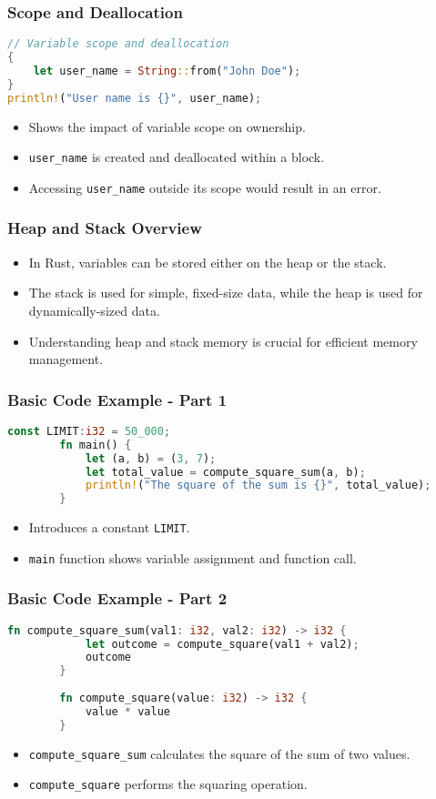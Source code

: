 \documentclass[aspectratio=169, table]{beamer}
\begin{document}
\begin{frame}[fragile]
\frametitle{Scope and Deallocation}
\begin{lstlisting}[language=Rust]
// Variable scope and deallocation
{
	let user_name = String::from("John Doe"); 
} 
println!("User name is {}", user_name); 
\end{lstlisting}
\begin{itemize}
\item Shows the impact of variable scope on ownership.
\item \texttt{user\_name} is created and deallocated within a block.
\item Accessing \texttt{user\_name} outside its scope would result in an error.
\end{itemize}
\end{frame}

\begin{frame}[fragile]
\frametitle{Heap and Stack Overview}
\begin{itemize}
\item In Rust, variables can be stored either on the heap or the stack.
\item The stack is used for simple, fixed-size data, while the heap is used for dynamically-sized data.
\item Understanding heap and stack memory is crucial for efficient memory management.
\end{itemize}
\end{frame}

\begin{frame}[fragile]
	\frametitle{Basic Code Example - Part 1}
	\begin{lstlisting}[language=Rust]
		const LIMIT:i32 = 50_000; 
		fn main() {
			let (a, b) = (3, 7); 
			let total_value = compute_square_sum(a, b); 
			println!("The square of the sum is {}", total_value); 
		} 
	\end{lstlisting}
	\begin{itemize}
		\item Introduces a constant \texttt{LIMIT}.
		\item \texttt{main} function shows variable assignment and function call.
	\end{itemize}
\end{frame}

\begin{frame}[fragile]
	\frametitle{Basic Code Example - Part 2}
	\begin{lstlisting}[language=Rust]
		fn compute_square_sum(val1: i32, val2: i32) -> i32 {
			let outcome = compute_square(val1 + val2); 
			outcome
		}
		
		fn compute_square(value: i32) -> i32 {
			value * value
		}
	\end{lstlisting}
	\begin{itemize}
		\item \texttt{compute\_square\_sum} calculates the square of the sum of two values.
		\item \texttt{compute\_square} performs the squaring operation.
	\end{itemize}
\end{frame}
\end{document}
